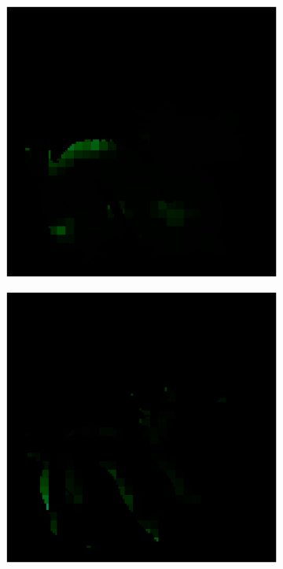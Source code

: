 \begin{figure}[H]
\begin{minipage}{0.32\linewidth}
\begin{subfigure}[t]{0.45\linewidth}
		\end{subfigure}
	\end{minipage}
	\begin{minipage}{0.32\linewidth}
		\begin{subfigure}[t]{0.45\linewidth}
			\includegraphics[width=\linewidth]{./Figures/feature_map_gcnn/feature_map_gcnn-noc_39.png}
		\end{subfigure}
		\begin{subfigure}[t]{0.45\linewidth}
			\includegraphics[width=\linewidth]{./Figures/feature_map_gcnn/feature_map_gcnn-noc_45.png}
		\end{subfigure}
		

\end{minipage}
\end{figure}

